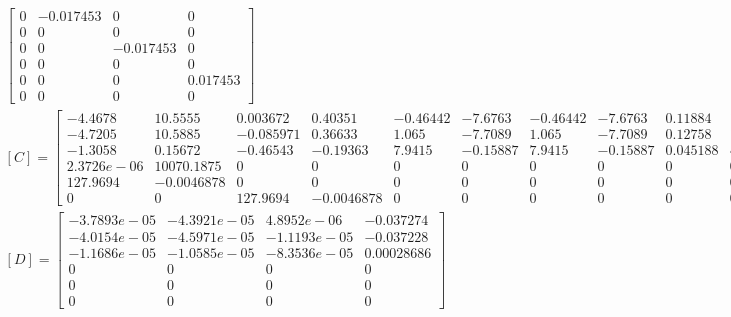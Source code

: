 \begin{landscape}
\begin{gather*}
\begin{bmatrix}
		0&-0.017453&0&0\\
		0&0&0&0\\
		0&0&-0.017453&0\\
		0&0&0&0\\
		0&0&0&0.017453\\
		0&0&0&0
	\end{bmatrix} \\
	[C] = \begin{bmatrix}
		-4.4678&10.5555&0.003672&0.40351&-0.46442&-7.6763&-0.46442&-7.6763&0.11884&153.1878&0.21724&162.964&-0.035862&-17.3488&144.925&17184.8658\\
		-4.7205&10.5885&-0.085971&0.36633&1.065&-7.7089&1.065&-7.7089&0.12758&161.4101&0.22579&169.8046&0.081999&39.6682&145.5045&17210.087\\
		-1.3058&0.15672&-0.46543&-0.19363&7.9415&-0.15887&7.9415&-0.15887&0.045188&42.4782&0.044078&35.2916&0.61198&296.0565&2.8082&107.1983\\
		2.3726e-06&10070.1875&0&0&0&0&0&0&0&0&0&0&0&0&0&0\\
		127.9694&-0.0046878&0&0&0&0&0&0&0&0&0&0&0&0&0&0\\
		0&0&127.9694&-0.0046878&0&0&0&0&0&0&0&0&0&0&0&0
	\end{bmatrix} \\
	[D] = \begin{bmatrix}
		-3.7893e-05&-4.3921e-05&4.8952e-06&-0.037274\\
		-4.0154e-05&-4.5971e-05&-1.1193e-05&-0.037228\\
		-1.1686e-05&-1.0585e-05&-8.3536e-05&0.00028686\\
		0&0&0&0\\
		0&0&0&0\\
		0&0&0&0
	\end{bmatrix}
\end{gather*}
\end{landscape}
